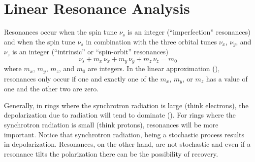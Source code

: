 \section{Linear Resonance Analysis}
\label{s:spin.lin.res}

Resonances occur when the spin tune $\nu_s$ is an integer (``imperfection'' resonances) and when the spin
tune $\nu_s$ in combination with the three orbital tunes $\nu_x$, $\nu_y$, and $\nu_z$ is an integer
(``intrinsic'' or ``spin-orbit'' resonances)
\begin{equation}
  \nu_s + m_x \, \nu_x + m_y \, \nu_y + m_z \, \nu_z = m_0
\end{equation}
where $m_x$, $m_y$, $m_z$, and $m_0$ are integers. In the linear approximation (),
resonances only occur if one and exactly one of the $m_x$, $m_y$, or $m_z$ has a value of one and
the other two are zero.

Generally, in rings where the synchrotron radiation is large (think electrons), the depolarization
due to radiation will tend to dominate (). For rings where the synchrotron radiation is
small (think protons), resonances will be more important. Notice that synchrotron radiation, being a
stochastic process results in depolarization. Resonances, on the other hand, are not stochastic and
even if a resonance tilts the polarization there can be the possibility of recovery.

